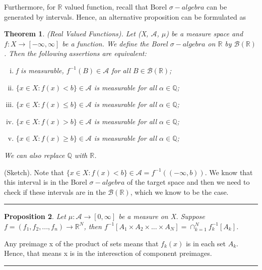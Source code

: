 \documentclass[twoside]{article}
\newcounter{lecnum}
\newtheorem{theorem}{Theorem}[lecnum]
\newtheorem{proposition}[theorem]{Proposition}
\newenvironment{proof}{{\bf Proof:}}{\hfill\rule{2mm}{2mm}}
\newcommand{\sa}{\sigma-algebra}
\begin{document}
Furthermore, for $\mathbb{R}$ valued function, recall that Borel $\sa$ can be generated by intervals. Hence, an alternative proposition can be formulated as

\begin{theorem}
(Real Valued Functions). Let (X, $\mathcal{A}$, $\mu$) be a measure space and $f: X \rightarrow [-\infty, \infty]$ be a function. We define the Borel $\sa$ on $\mathbb{R}$ by $\mathcal{B}(\mathbb{R})$. Then the following assertions are equivalent:
\begin{center}
    \begin{enumerate}[(i)]
        \item f is measurable, $f^{-1}(B) \in \mathcal{A}$ for all $B \in \mathcal{B}(\mathbb{R})$;
        \item $\{x \in X: f(x) < b\} \in \mathcal{A}$ is measurable for all $\alpha \in \mathbb{Q}$;
        \item $\{x \in X: f(x) \leq b\} \in \mathcal{A}$ is measurable for all $\alpha \in \mathbb{Q}$;
        \item $\{x \in X: f(x) > b\} \in \mathcal{A}$ is measurable for all $\alpha \in \mathbb{Q}$;
        \item $\{x \in X: f(x) \geq b\} \in \mathcal{A}$ is measurable for all $\alpha \in \mathbb{Q}$;        
    \end{enumerate}
\end{center}
We can also replace $\mathbb{Q}$ with $\mathbb{R}$.
\end{theorem}

\begin{proof}
(Sketch). Note that $\{x \in X: f(x) < b\} \in \mathcal{A} = f^{-1}((-\infty, b))$. We know that this interval is in the Borel $\sa$ of the target space and then we need to check if these intervals are in the $\mathcal{B}(\mathbb{R})$, which we know to be the case.
\end{proof}


\begin{proposition}
Let $\mu: \mathcal{A} \rightarrow [0,\infty]$ be a measure on X. Suppose $f = (f_1, f_2,...,f_n) \rightarrow \mathbb{R}^N$, then $f^{-1}[A_1 \times A_2 \times ... \times A_N] = \cap_{k=1}^{N}f_k^{-1}[A_k]$.
\end{proposition}
\begin{proof}
Any preimage x of the product of sets means that $f_k(x)$ is in each set $A_k$. Hence, that means x is in the interesction of component preimages.
\end{proof}
\end{document}

